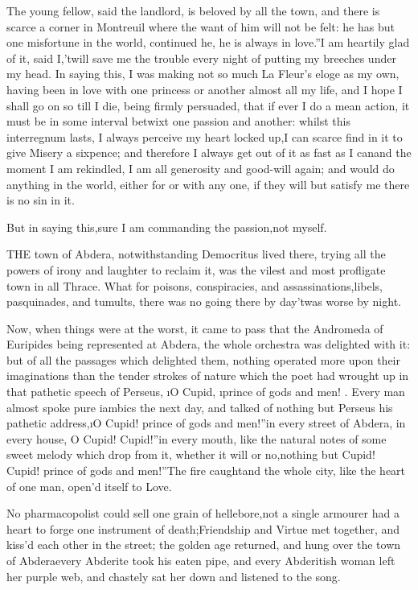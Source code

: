 \documentclass[twoside]{article}
\begin{document}
\tsk The young fellow, said the landlord, is beloved by all the town, and
there is scarce a corner in Montreuil where the want of him will not be
felt: he has but one misfortune in the world, continued he, \lqq he is always
in love.”\tsk I am heartily glad of it, said I,\tsk ’twill save me the trouble
every night of putting my breeches under my head.  In saying this, I was
making not so much La Fleur’s eloge as my own, having been in love with
one princess or another almost all my life, and I hope I shall go on so
till I die, being firmly persuaded, that if ever I do a mean action, it
must be in some interval betwixt one passion and another: whilst this
interregnum lasts, I always perceive my heart locked up,\tsk I can scarce
find in it to give Misery a sixpence; and therefore I always get out of
it as fast as I can\tsk and the moment I am rekindled, I am all generosity
and good-will again; and would do anything in the world, either for or
with any one, if they will but satisfy me there is no sin in it.

\tsk But in saying this,\tsk sure I am commanding the passion,\tsk not myself.






\tsk THE town of Abdera, notwithstanding Democritus lived there, trying all
the powers of irony and laughter to reclaim it, was the vilest and most
profligate town in all Thrace.  What for poisons, conspiracies, and
assassinations,\tsk libels, pasquinades, and tumults, there was no going
there by day\tsk ’twas worse by night.

Now, when things were at the worst, it came to pass that the Andromeda of
Euripides being represented at Abdera, the whole orchestra was delighted
with it: but of all the passages which delighted them, nothing operated
more upon their imaginations than the tender strokes of nature which the
poet had wrought up in that pathetic speech of Perseus, \i{O Cupid},
\i{prince of gods and men}! \etc.  Every man almost spoke pure iambics the
next day, and talked of nothing but Perseus his pathetic address,\tsk \lqq \i{O
Cupid! prince of gods and men}!”\tsk in every street of Abdera, in every
house, \lqq O Cupid!  Cupid!”\tsk in every mouth, like the natural notes of some
sweet melody which drop from it, whether it will or no,\tsk nothing but
\lqq Cupid! Cupid! prince of gods and men!”\tsk The fire caught\tsk and the whole
city, like the heart of one man, open’d itself to Love.

No pharmacopolist could sell one grain of hellebore,\tsk not a single
armourer had a heart to forge one instrument of death;\tsk Friendship and
Virtue met together, and kiss’d each other in the street; the golden age
returned, and hung over the town of Abdera\tsk every Abderite took his eaten
pipe, and every Abderitish woman left her purple web, and chastely sat
her down and listened to the song.
\end{document}
